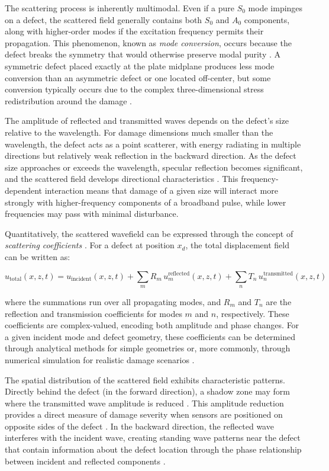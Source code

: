 \documentclass[12pt,a4paper]{report}
\begin{document}
The scattering process is inherently multimodal. Even if a pure $S_0$ mode impinges on a defect, the scattered field generally contains both $S_0$ and $A_0$ components, along with higher-order modes if the excitation frequency permits their propagation. This phenomenon, known as \textit{mode conversion}, occurs because the defect breaks the symmetry that would otherwise preserve modal purity \citep{ahn2021lamb}. A symmetric defect placed exactly at the plate midplane produces less mode conversion than an asymmetric defect or one located off-center, but some conversion typically occurs due to the complex three-dimensional stress redistribution around the damage \citep{cawley2018practical}.

The amplitude of reflected and transmitted waves depends on the defect's size relative to the wavelength. For damage dimensions much smaller than the wavelength, the defect acts as a point scatterer, with energy radiating in multiple directions but relatively weak reflection in the backward direction. As the defect size approaches or exceeds the wavelength, specular reflection becomes significant, and the scattered field develops directional characteristics \citep{rose2014ultrasonic}. This frequency-dependent interaction means that damage of a given size will interact more strongly with higher-frequency components of a broadband pulse, while lower frequencies may pass with minimal disturbance.

Quantitatively, the scattered wavefield can be expressed through the concept of \textit{scattering coefficients} \citep{ahn2021lamb}. For a defect at position $x_d$, the total displacement field can be written as:

\begin{equation}
u_{\text{total}}(x,z,t) = u_{\text{incident}}(x,z,t) + 
\sum_{m} R_m \, u_m^{\text{reflected}}(x,z,t) + 
\sum_{n} T_n \, u_n^{\text{transmitted}}(x,z,t)
\end{equation}

where the summations run over all propagating modes, and $R_m$ and $T_n$ are the reflection and transmission coefficients for modes $m$ and $n$, respectively. These coefficients are complex-valued, encoding both amplitude and phase changes. For a given incident mode and defect geometry, these coefficients can be determined through analytical methods for simple geometries or, more commonly, through numerical simulation for realistic damage scenarios \citep{ahn2021lamb,rose2014ultrasonic}.

The spatial distribution of the scattered field exhibits characteristic patterns. Directly behind the defect (in the forward direction), a shadow zone may form where the transmitted wave amplitude is reduced \citep{Im}. This amplitude reduction provides a direct measure of damage severity when sensors are positioned on opposite sides of the defect \citep{na2021review}. In the backward direction, the reflected wave interferes with the incident wave, creating standing wave patterns near the defect that contain information about the defect location through the phase relationship between incident and reflected components \citep{rose2014ultrasonic}.
\end{document}
